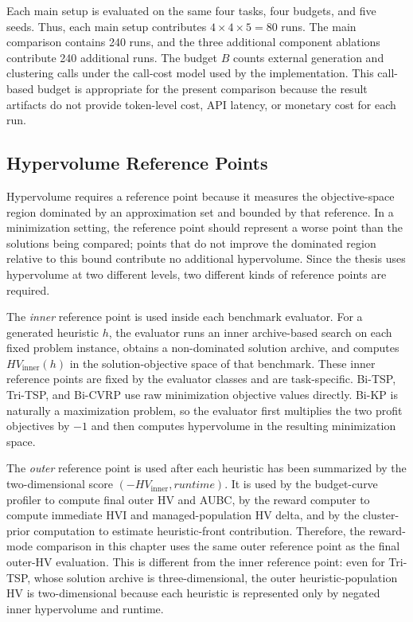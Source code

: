 \documentclass[../main.tex]{subfiles}
\begin{document}


Each main setup is evaluated on the same four tasks, four budgets, and five seeds. Thus, each main setup contributes $4\times4\times5=80$ runs. The main comparison contains 240 runs, and the three additional component ablations contribute 240 additional runs. The budget $B$ counts external generation and clustering calls under the call-cost model used by the implementation. This call-based budget is appropriate for the present comparison because the result artifacts do not provide token-level cost, API latency, or monetary cost for each run.

\subsection{Hypervolume Reference Points}

Hypervolume requires a reference point because it measures the objective-space region dominated by an approximation set and bounded by that reference. In a minimization setting, the reference point should represent a worse point than the solutions being compared; points that do not improve the dominated region relative to this bound contribute no additional hypervolume. Since the thesis uses hypervolume at two different levels, two different kinds of reference points are required.

The \emph{inner} reference point is used inside each benchmark evaluator. For a generated heuristic $h$, the evaluator runs an inner archive-based search on each fixed problem instance, obtains a non-dominated solution archive, and computes $HV_{\mathrm{inner}}(h)$ in the solution-objective space of that benchmark. These inner reference points are fixed by the evaluator classes and are task-specific. Bi-TSP, Tri-TSP, and Bi-CVRP use raw minimization objective values directly. Bi-KP is naturally a maximization problem, so the evaluator first multiplies the two profit objectives by $-1$ and then computes hypervolume in the resulting minimization space.

The \emph{outer} reference point is used after each heuristic has been summarized by the two-dimensional score $(-HV_{\mathrm{inner}}, runtime)$. It is used by the budget-curve profiler to compute final outer HV and AUBC, by the reward computer to compute immediate HVI and managed-population HV delta, and by the cluster-prior computation to estimate heuristic-front contribution. Therefore, the reward-mode comparison in this chapter uses the same outer reference point as the final outer-HV evaluation. This is different from the inner reference point: even for Tri-TSP, whose solution archive is three-dimensional, the outer heuristic-population HV is two-dimensional because each heuristic is represented only by negated inner hypervolume and runtime.
\end{document}

